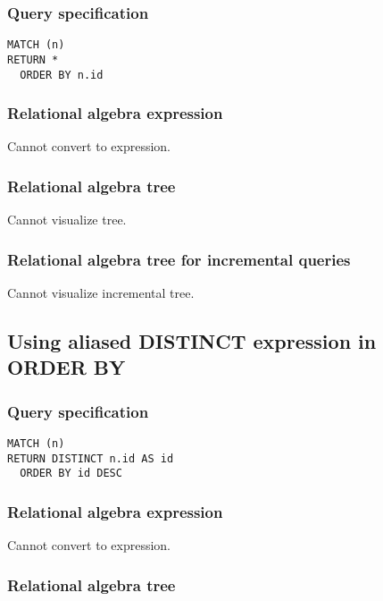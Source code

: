 \subsubsection*{Query specification}

\begin{lstlisting}
MATCH (n)
RETURN *
  ORDER BY n.id
\end{lstlisting}

\subsubsection*{Relational algebra expression}

Cannot convert to expression.

\subsubsection*{Relational algebra tree}

Cannot visualize tree.

\subsubsection*{Relational algebra tree for incremental queries}

Cannot visualize incremental tree.

\subsection{Using aliased DISTINCT expression in ORDER BY}

\subsubsection*{Query specification}

\begin{lstlisting}
MATCH (n)
RETURN DISTINCT n.id AS id
  ORDER BY id DESC
\end{lstlisting}

\subsubsection*{Relational algebra expression}

Cannot convert to expression.

\subsubsection*{Relational algebra tree}

